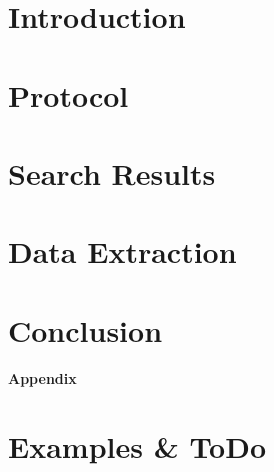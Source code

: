 



\frontmatter 

\cleardoublepage

\cleardoublepage

\cleardoublepage


\mainmatter



\chapter{Introduction}
\label{chap:intro}


\chapter{Protocol}
\label{chap:intro}


\chapter{Search Results}
\label{chap:intro}


\chapter{Data Extraction}
\label{chap:intro}


\chapter{Conclusion}
\label{chap:conclusion}

\appendix	%

\clearforchapter
\begin{vplace}[0.7]
\begin{center}
\Huge \textbf{Appendix}
\end{center}
\end{vplace}







%



\chapter{Examples \& ToDo}

\clearpage
\listoftodos
